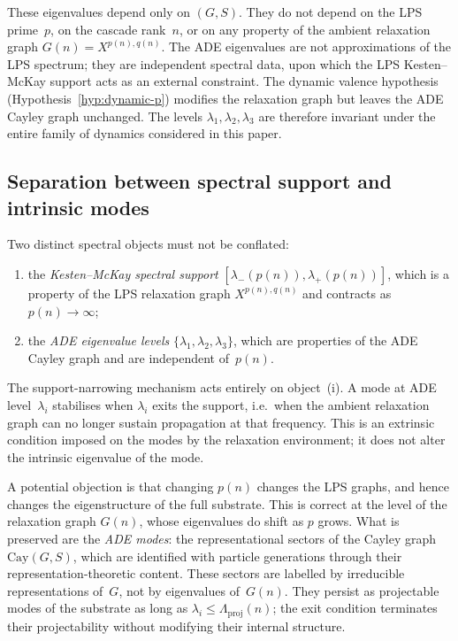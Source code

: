\documentclass[11pt,a4paper]{article}
\newcommand{\Lproj}{\Lambda_{\mathrm{proj}}}
\begin{document}
      These eigenvalues depend only on $(G, S)$.
      They do not depend on the LPS prime~$p$, on the cascade rank~$n$,
      or on any property of the ambient relaxation graph $G(n) = X^{p(n), q(n)}$.
      The ADE eigenvalues are not approximations of the LPS spectrum;
      they are independent spectral data, upon which the LPS Kesten--McKay
      support acts as an external constraint.
      The dynamic valence hypothesis (Hypothesis~\ref{hyp:dynamic-p}) modifies
      the relaxation graph but leaves the ADE Cayley graph unchanged.
      The levels $\lambda_1, \lambda_2, \lambda_3$ are therefore invariant
      under the entire family of dynamics considered in this paper.

    \subsection{Separation between spectral support and intrinsic modes}
      \label{subsec:separation}

      Two distinct spectral objects must not be conflated:
      \begin{enumerate}[label=(\roman*), nosep]
  \item the \emph{Kesten--McKay spectral support} $[\lambda_{-}(p(n)),\lambda_{+}(p(n))]$,
  which is a property of the LPS relaxation graph $X^{p(n),q(n)}$
  and contracts as $p(n)\to\infty$;
  \item the \emph{ADE eigenvalue levels} $\{\lambda_1, \lambda_2, \lambda_3\}$,
  which are properties of the ADE Cayley graph
  and are independent of~$p(n)$.
      \end{enumerate}
      The support-narrowing mechanism acts entirely on object~(i).
      A mode at ADE level~$\lambda_i$ stabilises when $\lambda_i$ exits the
      support, i.e.\ when the ambient relaxation graph can no longer sustain
      propagation at that frequency.
      This is an extrinsic condition imposed on the modes by the relaxation environment;
      it does not alter the intrinsic eigenvalue of the mode.

      A potential objection is that changing $p(n)$ changes the LPS graphs,
      and hence changes the eigenstructure of the full substrate.
      This is correct at the level of the relaxation graph $G(n)$,
      whose eigenvalues do shift as $p$ grows.
      What is preserved are the \emph{ADE modes}: the representational sectors
      of the Cayley graph $\mathrm{Cay}(G,S)$, which are identified with
      particle generations through their representation-theoretic content.
      These sectors are labelled by irreducible representations of~$G$,
      not by eigenvalues of~$G(n)$.
      They persist as projectable modes of the substrate as long as
      $\lambda_i \leq \Lproj(n)$; the exit condition terminates their projectability
      without modifying their internal structure.
\end{document}
